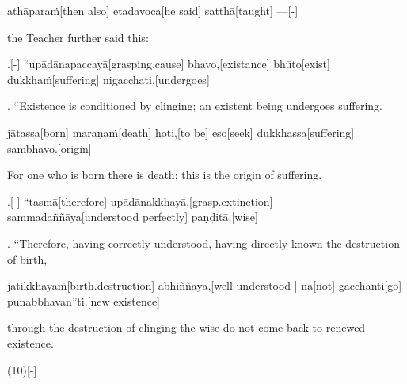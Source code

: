 \begin{samepage}
\begingl[glneveryline={\PaliGlossA,\PaliGlossB}]
athāparaṁ[then also] etadavoca[he said] satthā[taught] —[-]
\endgl
\nopagebreak
\linespread{0.5}
\begin{spacin}{0.2}
{\PaliGlossFT the Teacher further said this:}
\end{spacin}
\vskip 12pt
\end{samepage}
\vskip 0.2in
\begin{samepage}
.[-] “upādānapaccayā[grasping.cause] bhavo,[existance] bhūto[exist] dukkhaṁ[suffering] nigacchati.[undergoes]
\endgl
\nopagebreak
\linespread{0.5}
\begin{spacin}{0.2}
{. “Existence is conditioned by clinging; an existent being undergoes suffering.}
\end{spacin}
\vskip 12pt
\end{samepage}
\begin{samepage}
\begingl[glneveryline={\PaliGlossA,\PaliGlossB}]
jātassa[born] maraṇaṁ[death] hoti,[to be] eso[seek] dukkhassa[suffering] sambhavo.[origin]
\endgl
\nopagebreak
\linespread{0.5}
\begin{spacin}{0.2}
{\PaliGlossFT For one who is born there is death; this is the origin of suffering.}
\end{spacin}
\vskip 12pt
\end{samepage}
\begin{samepage}
.[-] “tasmā[therefore] upādānakkhayā,[grasp.extinction] sammadaññāya[understood perfectly] paṇḍitā.[wise]
\endgl
\nopagebreak
\linespread{0.5}
\begin{spacin}{0.2}
{. “Therefore, having correctly understood, having directly known the destruction of birth,}
\end{spacin}
\vskip 12pt
\end{samepage}
\begin{samepage}
\begingl[glneveryline={\PaliGlossA,\PaliGlossB}]
jātikkhayaṁ[birth.destruction] abhiññāya,[well understood ] na[not] gacchanti[go] punabbhavan”ti.[new existence]
\endgl
\nopagebreak
\linespread{0.5}
\begin{spacin}{0.2}
{\PaliGlossFT through the destruction of clinging the wise do not come back to renewed existence.}
\end{spacin}
\vskip 12pt
\end{samepage}
\vskip 0.2in
\begin{samepage}
\begingl[glneveryline={\PaliGlossA,\PaliGlossB}]
(10)[-]
\endgl
\nopagebreak
\linespread{0.5}
\begin{spacin}{0.2}
{\PaliGlossFT [10. Instigation]}
\end{spacin}
\vskip 12pt
\end{samepage}
